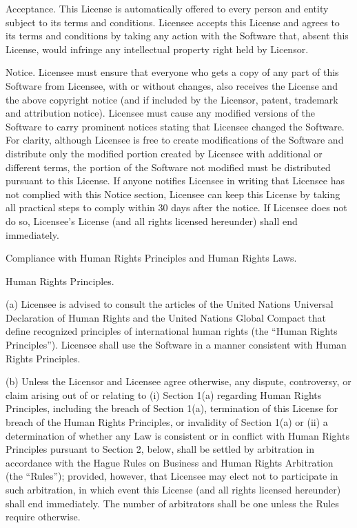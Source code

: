 \begin{DoxyItemize}
\item Acceptance. This License is automatically offered to every person and entity subject to its terms and conditions. Licensee accepts this License and agrees to its terms and conditions by taking any action with the Software that, absent this License, would infringe any intellectual property right held by Licensor.
\item Notice. Licensee must ensure that everyone who gets a copy of any part of this Software from Licensee, with or without changes, also receives the License and the above copyright notice (and if included by the Licensor, patent, trademark and attribution notice). Licensee must cause any modified versions of the Software to carry prominent notices stating that Licensee changed the Software. For clarity, although Licensee is free to create modifications of the Software and distribute only the modified portion created by Licensee with additional or different terms, the portion of the Software not modified must be distributed pursuant to this License. If anyone notifies Licensee in writing that Licensee has not complied with this Notice section, Licensee can keep this License by taking all practical steps to comply within 30 days after the notice. If Licensee does not do so, Licensee’s License (and all rights licensed hereunder) shall end immediately.
\item Compliance with Human Rights Principles and Human Rights Laws.
\begin{DoxyEnumerate}
\item Human Rights Principles.

(a) Licensee is advised to consult the articles of the United Nations Universal Declaration of Human Rights and the United Nations Global Compact that define recognized principles of international human rights (the “\+Human Rights Principles”). Licensee shall use the Software in a manner consistent with Human Rights Principles.

(b) Unless the Licensor and Licensee agree otherwise, any dispute, controversy, or claim arising out of or relating to (i) Section 1(a) regarding Human Rights Principles, including the breach of Section 1(a), termination of this License for breach of the Human Rights Principles, or invalidity of Section 1(a) or (ii) a determination of whether any Law is consistent or in conflict with Human Rights Principles pursuant to Section 2, below, shall be settled by arbitration in accordance with the Hague Rules on Business and Human Rights Arbitration (the “\+Rules”); provided, however, that Licensee may elect not to participate in such arbitration, in which event this License (and all rights licensed hereunder) shall end immediately. The number of arbitrators shall be one unless the Rules require otherwise.


\end{DoxyEnumerate}
\end{DoxyItemize}

